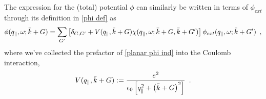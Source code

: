 The expression for the (total) potential $\phi$ can similarly be written in terms of $\phi_{ext}$ through its definition in \eqref{phi def} as
\begin{equation}
    \label{planar phi to phi ext relation}
    \phi(q_\parallel,\omega;\bar k+G) 
    =
    \sum_{G'}
    \left[
    \delta_{G,G'}
    +
    V(q_\parallel,\bar k+G)
    \chi(q_\parallel,\omega;\bar k+G, \bar k+G')
    \right]
    \phi_{ext}(q_\parallel,\omega;\bar k+ G')
    \,\,\,,
\end{equation}
where we've collected the prefactor of \eqref{planar phi ind} into the Coulomb interaction,
\begin{equation}
    \label{V def}
    V(q_\parallel,\bar k+G):=
    \frac{e^2}{\epsilon_0\left[ q_\parallel^2+\left(\bar k+G\right)^2\right]}
    \,\,\,.
\end{equation}
